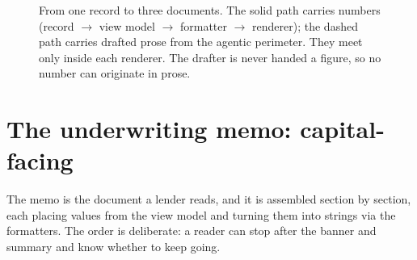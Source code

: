 \begin{figure}[H]
{}
\caption{From one record to three documents. The solid path carries numbers (record $\rightarrow$ view model $\rightarrow$ formatter $\rightarrow$ renderer); the dashed path carries drafted prose from the agentic perimeter. They meet only inside each renderer. The drafter is never handed a figure, so no number can originate in prose.}
\label{fig:outputs-flow}
\end{figure}

\section{The underwriting memo: capital-facing}

The memo is the document a lender reads, and it is assembled section by section, each placing values from the view model and turning them into strings via the formatters. The order is deliberate: a reader can stop after the banner and summary and know whether to keep going.

